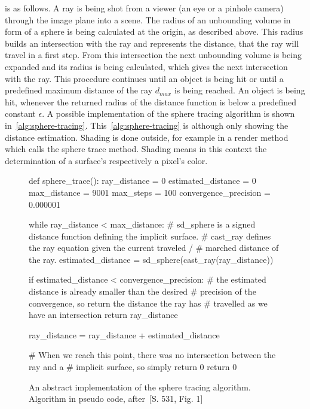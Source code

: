 \documentclass[%
    a4paper,    %
    justified,  %
    nobib,      %
    openany     %
]{tufte-book}
\begin{document}
 is as follows. A ray is being shot
from a viewer (an eye or a pinhole camera) through the image plane into a scene.
The radius of an unbounding volume in form of a sphere is being calculated at
the origin, as described above. This radius builds an intersection with the ray
and represents the distance, that the ray will travel in a first step. From this
intersection the next unbounding volume is being expanded and its radius is
being calculated, which gives the next intersection with the ray. This procedure
continues until an object is being hit or until a predefined maximum distance of
the ray $d_{max}$ is being reached. An object is being hit, whenever the
returned radius of the distance function is below a predefined constant
$\epsilon$. A possible implementation of the sphere tracing algorithm is shown
in~\autoref{alg:sphere-tracing}. This~\autoref{alg:sphere-tracing} is although
only showing the distance estimation. Shading is done outside, for example in a
render method which calls the sphere trace method. Shading means in this context
the determination of a surface's respectively a pixel's color.

 \begin{figure}
   \label{alg:sphere-tracing}
   \caption{%
     An abstract implementation of the sphere tracing algorithm. Algorithm in
     pseudo code, after~\cite{hart_sphere_1994}[S. 531, Fig. 1]
   }
   \begin{pythoncode}
def sphere_trace():
    ray_distance          = 0
    estimated_distance    = 0
    max_distance          = 9001
    max_steps             = 100
    convergence_precision = 0.000001

    while ray_distance < max_distance:
        # sd_sphere is a signed distance function defining the implicit surface.
        # cast_ray defines the ray equation given the current traveled /
        # marched distance of the ray.
        estimated_distance = sd_sphere(cast_ray(ray_distance))

        if estimated_distance < convergence_precision:
            # the estimated distance is already smaller than the desired
            # precision of the convergence, so return the distance the ray has
            # travelled as we have an intersection
            return ray_distance

        ray_distance = ray_distance + estimated_distance

    # When we reach this point, there was no intersection between the ray and a
    # implicit surface, so simply return 0
    return 0
   \end{pythoncode}
\end{figure}
\end{document}
